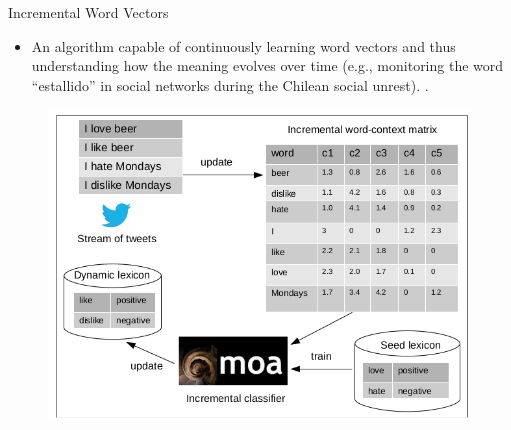\documentclass[handout]{beamer}
\begin{document}
\begin{frame}{Incremental Word Vectors}
\begin{scriptsize}
\begin{itemize}
 \item An algorithm capable of continuously learning word vectors and thus understanding how the meaning evolves over time (e.g., monitoring the word ``estallido'' in social networks during the Chilean social unrest). \cite{bravo2021incremental}.
\end{itemize}
  \begin{figure}[h]
        	\includegraphics[scale = 0.35]{pics/incdiagram.png}
        \end{figure}

\end{scriptsize}
\end{frame}
\end{document}
